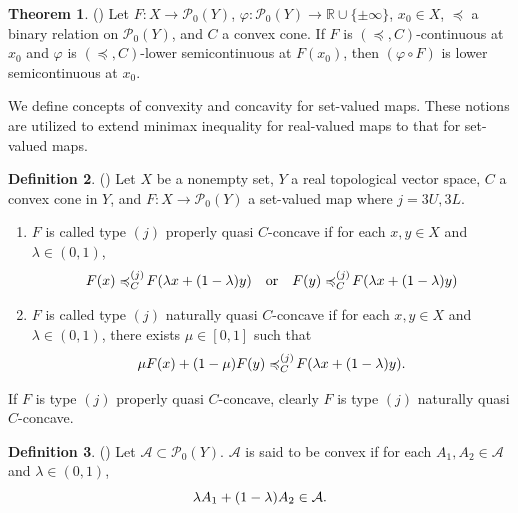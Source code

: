 \documentclass[a4paper,11pt]{jsarticle}
\theoremstyle{definition}
\newtheorem{dfn}{Definition}[section]
\newtheorem{thm}[dfn]{Theorem}
\newcommand{\RealNumberSet}{\mathbb{R}}
\newcommand{\pow}[1]{\mathcal{P}_{0}(#1)}
\newcommand{\setrel}[2]{\preccurlyeq^{(#1)}_{#2}\!}
\begin{document}
\begin{thm}{(\cite{DechboonTanaka2024})}
  Let $F \colon X \to \pow{Y}$, $\varphi \colon \pow{Y} \to \RealNumberSet \cup \{\pm \infty\}$, $x_0 \in X$,
  $\preccurlyeq$ a binary relation on $\pow{Y}$, and $C$ a convex cone. If $F$ is $(\preccurlyeq, C)$-continuous at $x_0$
  and $\varphi$ is $(\preccurlyeq, C)$-lower semicontinuous at $F(x_0)$, then $(\varphi \circ F)$ is lower semicontinuous at $x_0$.
\end{thm}

We define concepts of convexity and concavity for set-valued maps. These notions are utilized to
extend minimax inequality for real-valued maps to that for set-valued maps.

\begin{dfn}{(\cite{KuwanoTanakaYamada2010})}
  Let $X$ be a nonempty set, $Y$ a real topological vector space,
  $C$ a convex cone in $Y$, and $F\colon X \to \pow{Y}$ a set-valued map
  where $j= 3U, 3L$.
  \begin{enumerate}
    \item $F$ is called type $(j)$ properly quasi $C$-concave if for each $x,y \in X$ and $\lambda \in (0,1)$,
          \begin{equation}
            F(x) \setrel{j}{C} F(\lambda x + (1-\lambda)y) \quad \text{or} \quad F(y) \setrel{j}{C} F(\lambda x + (1-\lambda)y) \notag
          \end{equation}
    \item $F$ is called type $(j)$ naturally quasi $C$-concave if for each $x,y \in X$ and $\lambda \in (0,1)$, there exists $\mu \in [0,1]$ such that
          \begin{equation}
            \mu F(x) + (1-\mu) F(y) \setrel{j}{C} F(\lambda x + (1-\lambda)y). \notag
          \end{equation}
  \end{enumerate}
\end{dfn}

If $F$ is type $(j)$ properly quasi $C$-concave,
clearly $F$ is type $(j)$ naturally quasi $C$-concave.

\begin{dfn}{(\cite{KobayashiSaitoTanaka2016})}
  Let $\mathcal{A} \subset \pow{Y}$. $\mathcal{A}$ is said to be convex if for each $A_1, A_2 \in \mathcal{A}$ and $\lambda \in (0,1)$,
  \begin{equation}
    \lambda A_1 + (1-\lambda) A_2 \in \mathcal{A}. \notag
  \end{equation}
\end{dfn}
\end{document}
